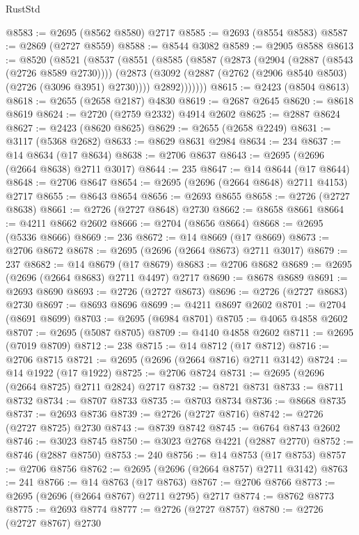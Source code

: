 \begin{lexlean}{RustStd}
\begin{coremodule}
@8583 := @2695 (@8562 @8580) @2717
@8585 := @2693 (@8554 @8583)
@8587 := @2869 (@2727 @8559)
@8588 := @8544 @3082
@8589 := @2905 @8588
@8613 := @8520
    (@8521
      (@8537
        (@8551
          (@8585
            (@8587
              (@2873
                (@2904 (@2887 (@8543 (@2726 @8589 @2730))))
                (@2873
                  (@3092 (@2887 (@2762 (@2906 @8540 @8503) (@2726 (@3096 @3951) @2730))))
                  @2892)))))))
@8615 := @2423 (@8504 @8613)
@8618 := @2655 (@2658 @2187) @4830
@8619 := @2687 @2645
@8620 := @8618 @8619
@8624 := @2720 (@2759 @2332) @4914 @2602
@8625 := @2887 @8624
@8627 := @2423 (@8620 @8625)
@8629 := @2655 (@2658 @2249)
@8631 := @3117 (@5368 @2682)
@8633 := @8629 @8631 @2984
@8634 := 234
@8637 := @14 @8634 (@17 @8634)
@8638 := @2706 @8637
@8643 := @2695 (@2696 (@2664 @8638) @2711 @3017)
@8644 := 235
@8647 := @14 @8644 (@17 @8644)
@8648 := @2706 @8647
@8654 := @2695 (@2696 (@2664 @8648) @2711 @4153) @2717
@8655 := @8643 @8654
@8656 := @2693 @8655
@8658 := @2726 (@2727 @8638)
@8661 := @2726 (@2727 @8648) @2730
@8662 := @8658 @8661
@8664 := @4211 @8662 @2602
@8666 := @2704 (@8656 @8664)
@8668 := @2695 (@5336 @8666)
@8669 := 236
@8672 := @14 @8669 (@17 @8669)
@8673 := @2706 @8672
@8678 := @2695 (@2696 (@2664 @8673) @2711 @3017)
@8679 := 237
@8682 := @14 @8679 (@17 @8679)
@8683 := @2706 @8682
@8689 := @2695 (@2696 (@2664 @8683) @2711 @4497) @2717
@8690 := @8678 @8689
@8691 := @2693 @8690
@8693 := @2726 (@2727 @8673)
@8696 := @2726 (@2727 @8683) @2730
@8697 := @8693 @8696
@8699 := @4211 @8697 @2602
@8701 := @2704 (@8691 @8699)
@8703 := @2695 (@6984 @8701)
@8705 := @4065 @4858 @2602
@8707 := @2695 (@5087 @8705)
@8709 := @4140 @4858 @2602
@8711 := @2695 (@7019 @8709)
@8712 := 238
@8715 := @14 @8712 (@17 @8712)
@8716 := @2706 @8715
@8721 := @2695 (@2696 (@2664 @8716) @2711 @3142)
@8724 := @14 @1922 (@17 @1922)
@8725 := @2706 @8724
@8731 := @2695 (@2696 (@2664 @8725) @2711 @2824) @2717
@8732 := @8721 @8731
@8733 := @8711 @8732
@8734 := @8707 @8733
@8735 := @8703 @8734
@8736 := @8668 @8735
@8737 := @2693 @8736
@8739 := @2726 (@2727 @8716)
@8742 := @2726 (@2727 @8725) @2730
@8743 := @8739 @8742
@8745 := @6764 @8743 @2602
@8746 := @3023 @8745
@8750 := @3023 @2768 @4221 (@2887 @2770)
@8752 := @8746 (@2887 @8750)
@8753 := 240
@8756 := @14 @8753 (@17 @8753)
@8757 := @2706 @8756
@8762 := @2695 (@2696 (@2664 @8757) @2711 @3142)
@8763 := 241
@8766 := @14 @8763 (@17 @8763)
@8767 := @2706 @8766
@8773 := @2695 (@2696 (@2664 @8767) @2711 @2795) @2717
@8774 := @8762 @8773
@8775 := @2693 @8774
@8777 := @2726 (@2727 @8757)
@8780 := @2726 (@2727 @8767) @2730

\end{coremodule}
\end{lexlean}
